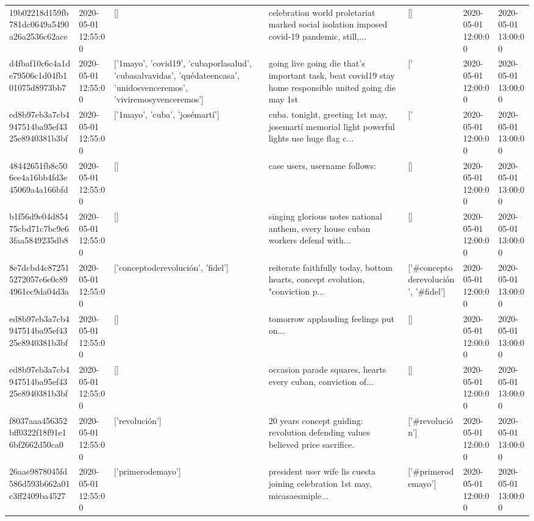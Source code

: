 \begin{tabular}{lllllll}
19b02218d159fb781dc0649a5490a26a2536c62ace & 2020-05-01 12:55:00 & [] & celebration world proletariat marked social isolation imposed covid-19 pandemic, still,... & [] & 2020-05-01 12:00:00 & 2020-05-01 13:00:00 \\
d4fbaf10c6c4a1de79506c1d04fb101075d8973bb7 & 2020-05-01 12:55:00 & ['1mayo', 'covid19', 'cubaporlasalud', 'cubasalvavidas', 'quédateencasa', 'unidosvenceremos', 'viviremosyvenceremos'] & going live going die that's important task, beat covid19 stay home responsible united going die may 1st & ['#1mayo', '#covid19', '#cubaporlasalud', '#cubasalvavidas', '#quédateencasa', '#unidosvenceremos', '#viviremosyvenceremos'] & 2020-05-01 12:00:00 & 2020-05-01 13:00:00 \\
ed8b97eb3a7cb4947514ba95ef4325e8940381b3bf & 2020-05-01 12:55:00 & ['1mayo', 'cuba', 'josémartí'] & cuba. tonight, greeting 1st may, josemartí memorial light powerful lights use huge flag c... & ['#1mayo', '#cuba', '#josémartí'] & 2020-05-01 12:00:00 & 2020-05-01 13:00:00 \\
48442651fb8c506ee4a16bb4fd3e45069a4a166bfd & 2020-05-01 12:55:00 & [] & case users, username follows: & [] & 2020-05-01 12:00:00 & 2020-05-01 13:00:00 \\
b1f56d9e04d85475cbd71c7bc9e63faa5849235db8 & 2020-05-01 12:55:00 & [] & singing glorious notes national anthem, every house cuban workers defend with... & [] & 2020-05-01 12:00:00 & 2020-05-01 13:00:00 \\
8e7dcbd4c872515272057e6e0c894961ec9da04d3a & 2020-05-01 12:55:00 & ['conceptoderevolución', 'fidel'] & reiterate faithfully today, bottom hearts, concept evolution, "conviction p... & ['#conceptoderevolución', '#fidel'] & 2020-05-01 12:00:00 & 2020-05-01 13:00:00 \\
ed8b97eb3a7cb4947514ba95ef4325e8940381b3bf & 2020-05-01 12:55:00 & [] & tomorrow applauding feelings put on... & [] & 2020-05-01 12:00:00 & 2020-05-01 13:00:00 \\
ed8b97eb3a7cb4947514ba95ef4325e8940381b3bf & 2020-05-01 12:55:00 & [] & occasion parade squares, hearts every cuban, conviction of... & [] & 2020-05-01 12:00:00 & 2020-05-01 13:00:00 \\
f8037aaa456352bff0322f18f91e16bf2662d50ca0 & 2020-05-01 12:55:00 & ['revolución'] & 20 years concept guiding: revolution defending values believed price sacrifice. & ['#revolución'] & 2020-05-01 12:00:00 & 2020-05-01 13:00:00 \\
26aae9878045fd586d593b662a01c3ff2409ba4527 & 2020-05-01 12:55:00 & ['primerodemayo'] & president user wife lis cuesta joining celebration 1st may, micasaesmiple... & ['#primerodemayo'] & 2020-05-01 12:00:00 & 2020-05-01 13:00:00 \\

\end{tabular}
